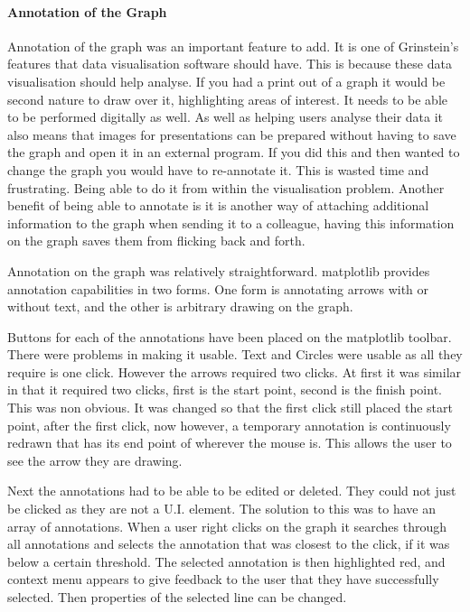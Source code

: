 \paragraph{Annotation of the Graph}

Annotation of the graph was an important feature to add.  It is one of Grinstein's features that data visualisation software should have.  This is because these data visualisation should help analyse.  If you had a print out of a graph it would be second nature to draw over it, highlighting areas of interest.  It needs to be able to be performed digitally as well.  As well as helping users analyse their data it also means that images for presentations can be prepared without having to save the graph and open it in an external program.  If you did this and then wanted to change the graph you would have to re-annotate it.  This is wasted time and frustrating.  Being able to do it from within the visualisation problem.  Another benefit of being able to annotate is it is another way of attaching additional information to the graph when sending it to a colleague, having this information on the graph saves them from flicking back and forth.

Annotation on the graph was relatively straightforward.  matplotlib provides annotation capabilities in two forms.  One form is annotating arrows with or without text, and the other is arbitrary drawing on the graph.

Buttons for each of the annotations have been placed on the matplotlib toolbar.  There were problems in making it usable.  Text and Circles were usable as all they require is one click.  However the arrows required two clicks.  At first it was similar in that it required two clicks, first is the start point, second is the finish point.  This was non obvious.  It was changed so that the first click still placed the start point, after the first click, now however, a temporary annotation is continuously redrawn that has its end point of wherever the mouse is.  This allows the user to see the arrow they are drawing.

Next the annotations had to be able to be edited or deleted.  They could not just be clicked as they are not a U.I. element.  The solution to this was to have an array of annotations.  When a user right clicks on the graph it searches through all annotations and selects the annotation that was closest to the click, if it was below a certain threshold.  The selected annotation is then highlighted red, and context menu appears to give feedback to the user that they have successfully selected.  Then properties of the selected line can be changed.

